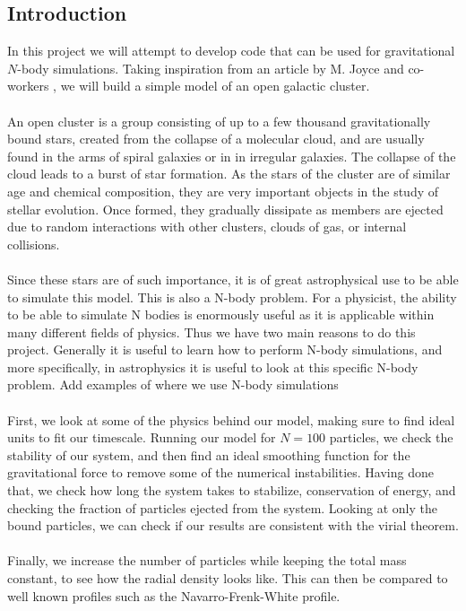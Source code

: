 \documentclass{article}
\newcommand{\husk}[1]{\color{red} #1 \color{black}}
\begin{document}
\subsection{Introduction}
In this project we will attempt to develop code that can be used for gravitational $N$-body simulations. Taking inspiration from an article by M. Joyce and co-workers \cite{Joyce}, we will build a simple model of an open galactic cluster.
\\\\
An open cluster is a group consisting of up to a few thousand gravitationally bound stars, created from the collapse of a molecular cloud, and are usually found in the arms of spiral galaxies or in in irregular galaxies. The collapse of the cloud leads to a burst of star formation. As the stars of the cluster are of similar age and chemical composition, they are very important objects in the study of stellar evolution. Once formed, they gradually dissipate as members are ejected due to random interactions with other clusters, clouds of gas, or internal collisions. \\ \\
Since these stars are of such importance, it is of great astrophysical use to be able to simulate this model. This is also a N-body problem. For a physicist, the ability to be able to simulate N bodies is enormously useful as it is applicable within many different fields of physics. Thus we have two main reasons to do this project. Generally it is useful to learn how to perform N-body simulations, and more specifically, in astrophysics it is useful to look at this specific N-body problem.
\husk{Add examples of where we use N-body simulations}
\\\\
First, we look at some of the physics behind our model, making sure to find ideal units to fit our timescale. Running our model for $N = 100$ particles, we check the stability of our system, and then find an ideal smoothing function for the gravitational force to remove some of the numerical instabilities. Having done that, we check how long the system takes to stabilize, conservation of energy, and checking the fraction of particles ejected from the system. Looking at only the bound particles, we can check if our results are consistent with the virial theorem.
\\\\
Finally, we increase the number of particles while keeping the total mass constant, to see how the radial density looks like. This can then be compared to well known profiles such as the Navarro-Frenk-White profile.
\end{document}
